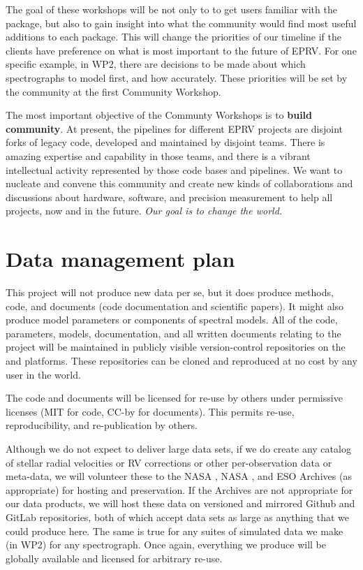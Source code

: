 \documentclass[12pt]{article}
\begin{document}
The goal of these workshops will be not only to to get users familiar with the package, but also to gain insight into what the community would find most useful additions to each package. This will change the priorities of our timeline if the clients have preference on what is most important to the future of EPRV. For one specific example, in WP2, there are decisions to be made about which spectrographs to model first, and how accurately. These priorities will be set by the community at the first Community Workshop.

The most important objective of the Communty Workshops is to \textbf{build community}.
At present, the pipelines for different EPRV projects are disjoint forks of legacy code, developed and maintained by disjoint teams.
There is amazing expertise and capability in those teams, and there is a vibrant intellectual activity represented by those code bases and pipelines.
We want to nucleate and convene this community and create new kinds of collaborations and discussions about hardware, software, and precision measurement to help all projects, now and in the future.
\emph{Our goal is to change the world.}

\section*{Data management plan}

This project will not produce new data per se, but it does produce methods, code, and documents (code documentation and scientific papers). It might also produce model parameters or components of spectral models. All of the code, parameters, models, documentation, and all written documents relating to the project will be maintained in publicly visible version-control repositories on the  and  platforms. These repositories can be cloned and reproduced at no cost by any user in the world.

The code and documents will be licensed for re-use by others under permissive licenses (MIT for code, CC-by for documents). This permits re-use, reproducibility, and re-publication by others.

Although we do not expect to deliver large data sets, if we do create any catalog of stellar radial velocities or RV corrections or other per-observation data or meta-data, we will volunteer these to the NASA , NASA , and ESO  Archives (as appropriate) for hosting and preservation. If the Archives are not appropriate for our data products, we will host these data on versioned and mirrored Github and GitLab repositories, both of which accept data sets as large as anything that we could produce here. The same is true for any suites of simulated data we make (in WP2) for any spectrograph.
Once again, everything we produce will be globally available and licensed for arbitrary re-use.
\end{document}
